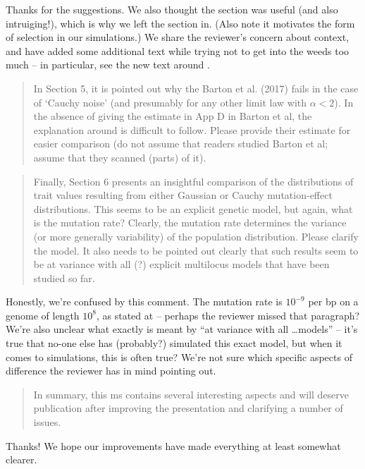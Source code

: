 Thanks for the suggestions.
We also thought the section was useful (and also intruiging!),
which is why we left the section in.
(Also note it motivates the form of selection in our simulations.)
We share the reviewer's concern about context,
and have added some additional text
while trying not to get into the weeds too much
-- in particular, see the new text around .

\begin{quote}
In Section 5, it is pointed out why the Barton et al. (2017) fails in the case of ‘Cauchy
noise’ (and presumably for any other limit law with $\alpha < 2$). In the absence of giving the
estimate in App D in Barton et al, the explanation around  is difficult to
follow. Please provide their estimate for easier comparison (do not assume that readers
studied Barton et al; assume that they scanned (parts) of it).
\end{quote}


\begin{quote}
Finally, Section 6 presents an insightful comparison of the distributions of trait values
resulting from either Gaussian or Cauchy mutation-effect distributions. This seems to be
an explicit genetic model, but again, what is the mutation rate? Clearly, the mutation
rate determines the variance (or more generally variability) of the population distribution.
Please clarify the model. It also needs to be pointed out clearly that such results seem to
be at variance with all (?) explicit multilocus models that have been studied so far.
\end{quote}

Honestly, we're confused by this comment.
The mutation rate is $10^{-9}$ per bp on a genome of length $10^8$,
as stated at  -- perhaps the reviewer missed that paragraph?
We're also unclear what exactly is meant by ``at variance with all \ldots models'' --
it's true that no-one else has (probably?) simulated this exact model,
but when it comes to simulations, this is often true?
We're not sure which specific aspects of difference the reviewer has in mind pointing out.

\begin{quote}
In summary, this ms contains several interesting aspects and will deserve publication after
improving the presentation and clarifying a number of issues.
\end{quote}

Thanks! We hope our improvements
have made everything at least somewhat clearer.


